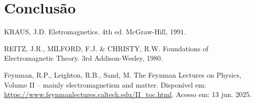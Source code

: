 \documentclass[12pt]{article}
\begin{document}
\clearpage
\section{Conclusão}

\clearpage
\begin{thebibliography}{9}
  KRAUS, J.D. Eletromagnetics. 4th ed. McGraw-Hill, 1991.

  REITZ, J.R., MILFORD, F.J. \& CHRISTY, R.W. Foundations of
  Electromagnetic Theory. 3rd Addison-Wesley, 1980.

  Feynman, R.P., Leighton, R.B., Sand, M. The Feynman Lectures on
  Physics, Volume II – mainly electromagnetism and matter. Disponível
  em: \url{https://www.feynmanlectures.caltech.edu/II_toc.html}.
  Acesso em: 13 jun. 2025.
\end{thebibliography}
\end{document}
